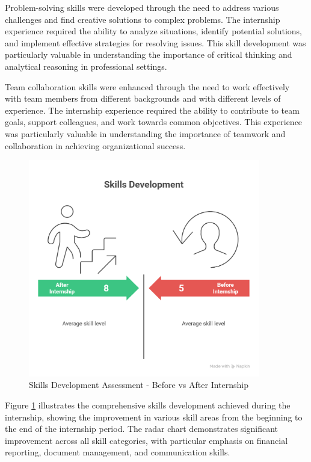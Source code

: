 Problem-solving skills were developed through the need to address various challenges and find creative solutions to complex problems. The internship experience required the ability to analyze situations, identify potential solutions, and implement effective strategies for resolving issues. This skill development was particularly valuable in understanding the importance of critical thinking and analytical reasoning in professional settings.

Team collaboration skills were enhanced through the need to work effectively with team members from different backgrounds and with different levels of experience. The internship experience required the ability to contribute to team goals, support colleagues, and work towards common objectives. This experience was particularly valuable in understanding the importance of teamwork and collaboration in achieving organizational success.

\begin{figure}[H]
    \centering
    \includegraphics[width=0.9\textwidth]{assets/images/skills_radar_chart.png}
    \caption{Skills Development Assessment - Before vs After Internship}
    \label{fig:skills_radar_chart}
\end{figure}

Figure \ref{fig:skills_radar_chart} illustrates the comprehensive skills development achieved during the internship, showing the improvement in various skill areas from the beginning to the end of the internship period. The radar chart demonstrates significant improvement across all skill categories, with particular emphasis on financial reporting, document management, and communication skills.

